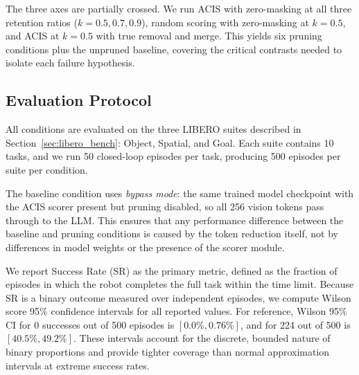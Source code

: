 The three axes are partially crossed. We run ACIS with zero-masking at all three retention ratios ($k{=}0.5, 0.7, 0.9$), random scoring with zero-masking at $k{=}0.5$, and ACIS at $k{=}0.5$ with true removal and merge. This yields six pruning conditions plus the unpruned baseline, covering the critical contrasts needed to isolate each failure hypothesis.

\subsection{Evaluation Protocol}
\label{sec:eval_protocol}

All conditions are evaluated on the three LIBERO suites described in Section~\ref{sec:libero_bench}: Object, Spatial, and Goal. Each suite contains 10 tasks, and we run 50 closed-loop episodes per task, producing 500 episodes per suite per condition.

The baseline condition uses \emph{bypass mode}: the same trained model checkpoint with the ACIS scorer present but pruning disabled, so all 256 vision tokens pass through to the LLM. This ensures that any performance difference between the baseline and pruning conditions is caused by the token reduction itself, not by differences in model weights or the presence of the scorer module.

We report Success Rate (SR) as the primary metric, defined as the fraction of episodes in which the robot completes the full task within the time limit. Because SR is a binary outcome measured over independent episodes, we compute Wilson score 95\% confidence intervals for all reported values. For reference, Wilson 95\% CI for 0 successes out of 500 episodes is $[0.0\%, 0.76\%]$, and for 224 out of 500 is $[40.5\%, 49.2\%]$. These intervals account for the discrete, bounded nature of binary proportions and provide tighter coverage than normal approximation intervals at extreme success rates.

